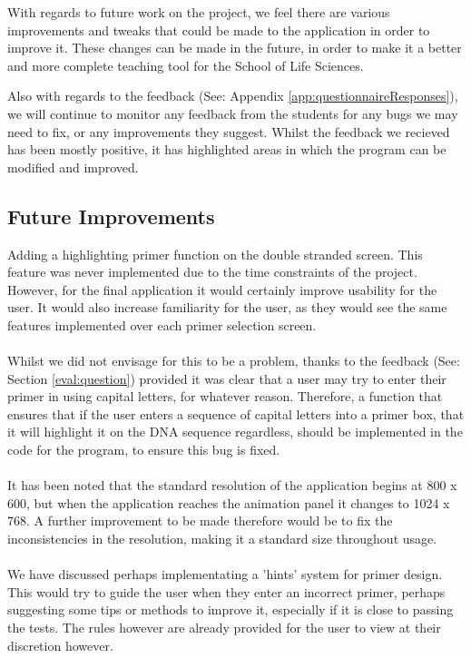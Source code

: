 With regards to future work on the project, we feel there are various improvements and tweaks that could be made to the application in order to improve it. These changes can be made in the future, in order to make it a better and more complete teaching tool for the School of Life Sciences.

Also with regards to the feedback (See: Appendix \ref{app:questionnaireResponses}), we will continue to monitor any feedback from the students for any bugs we may need to fix, or any improvements they suggest. Whilst the feedback we recieved has been mostly positive, it has highlighted areas in which the program can be modified and improved.

\subsection{Future Improvements}

Adding a highlighting primer function on the double stranded screen. This feature was never implemented due to the time constraints of the project. However, for the final application it would certainly improve usability for the user. It would also increase familiarity for the user, as they would see the same features implemented over each primer selection screen. \\ \\

Whilst we did not envisage for this to be a problem, thanks to the feedback (See: Section \ref{eval:question}) provided it was clear that a user may try to enter their primer in using capital letters, for whatever reason. Therefore, a function that ensures that if the user enters a sequence of capital letters into a primer box, that it will highlight it on the DNA sequence regardless, should be implemented in the code for the program, to ensure this bug is fixed. \\ \\

It has been noted that the standard resolution of the application begins at 800 x 600, but when the application reaches the animation panel it changes to 1024 x 768. A further improvement to be made therefore would be to fix the inconsistencies in the resolution, making it a standard size throughout usage. \\ \\

We have discussed perhaps implementating a 'hints' system for primer design. This would try to guide the user when they enter an incorrect primer, perhaps suggesting some tips or methods to improve it, especially if it is close to passing the tests. The rules however are already provided for the user to view at their discretion however. \\ \\

